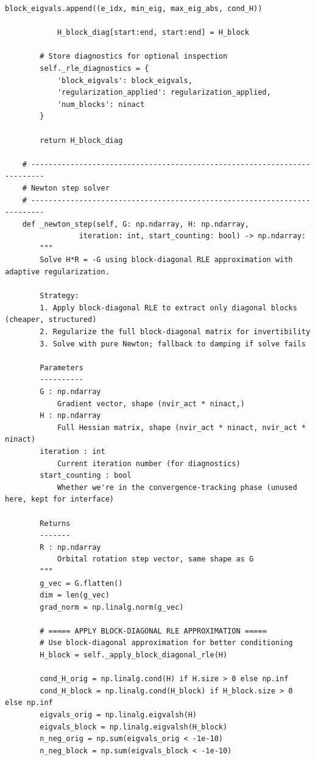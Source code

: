 \begin{lstlisting}[style=python, caption={...}, label=lst:full_code]
            block_eigvals.append((e_idx, min_eig, max_eig_abs, cond_H))

            H_block_diag[start:end, start:end] = H_block
        
        # Store diagnostics for optional inspection
        self._rle_diagnostics = {
            'block_eigvals': block_eigvals,
            'regularization_applied': regularization_applied,
            'num_blocks': ninact
        }
        
        return H_block_diag

    # -------------------------------------------------------------------------
    # Newton step solver 
    # -------------------------------------------------------------------------
    def _newton_step(self, G: np.ndarray, H: np.ndarray,
                 iteration: int, start_counting: bool) -> np.ndarray:
        """
        Solve H*R = -G using block-diagonal RLE approximation with adaptive regularization.
        
        Strategy:
        1. Apply block-diagonal RLE to extract only diagonal blocks (cheaper, structured)
        2. Regularize the full block-diagonal matrix for invertibility
        3. Solve with pure Newton; fallback to damping if solve fails
        
        Parameters
        ----------
        G : np.ndarray
            Gradient vector, shape (nvir_act * ninact,)
        H : np.ndarray
            Full Hessian matrix, shape (nvir_act * ninact, nvir_act * ninact)
        iteration : int
            Current iteration number (for diagnostics)
        start_counting : bool
            Whether we're in the convergence-tracking phase (unused here, kept for interface)
        
        Returns
        -------
        R : np.ndarray
            Orbital rotation step vector, same shape as G
        """
        g_vec = G.flatten()
        dim = len(g_vec)
        grad_norm = np.linalg.norm(g_vec)

        # ===== APPLY BLOCK-DIAGONAL RLE APPROXIMATION =====
        # Use block-diagonal approximation for better conditioning
        H_block = self._apply_block_diagonal_rle(H)
        
        cond_H_orig = np.linalg.cond(H) if H.size > 0 else np.inf
        cond_H_block = np.linalg.cond(H_block) if H_block.size > 0 else np.inf
        eigvals_orig = np.linalg.eigvalsh(H)
        eigvals_block = np.linalg.eigvalsh(H_block)
        n_neg_orig = np.sum(eigvals_orig < -1e-10)
        n_neg_block = np.sum(eigvals_block < -1e-10)


\end{lstlisting}
